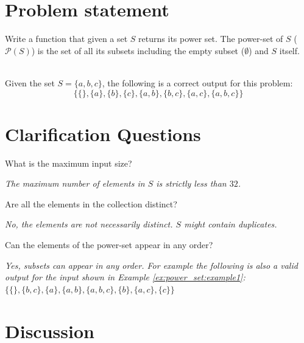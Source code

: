 \section{Problem statement}
    \begin{exercise}
        Write a function that given a set $S$ returns its power set.
The power-set of $S$ ($\mathcal{P}(S)$) is the set of all its subsets including the empty subset ($\emptyset$) and $S$ itself.

        \begin{example}
            \label{ex:power_set:example1}
            \hfill \\
            Given the set $S=\{a,b,c\}$, the following is a correct output for
            this problem: $$\{\{\}, \{a\}, \{b\}, \{c\}, \{a,b\}, \{b,c\}, \{a,c\}, \{a,b,c\} \}$$
        \end{example}
    \end{exercise}

\section{Clarification Questions}

\begin{QandA}
    \item What is the maximum input size?
    \begin{answered}
        \textit{The maximum number of elements in $S$ is strictly less than $32$.}
    \end{answered}
    
    \item Are all the elements in the collection distinct?
    \begin{answered}
        \textit{No, the elements are not necessarily distinct. $S$ might contain duplicates.}
    \end{answered}

    \item Can the elements of the power-set appear in any order?
    \begin{answered}
        \textit{Yes, subsets can appear in any order. 
        For example the following is also a valid output for the input shown in Example \ref{ex:power_set:example1}:} 
        $\{\{\}, \{b,c\}, \{a\}, \{a,b\}, \{a,b,c\}, \{b\}, \{a,c\}, \{c\} \}$
    \end{answered}
\end{QandA}

\section{Discussion}
\label{sec:powerset:discussion}

